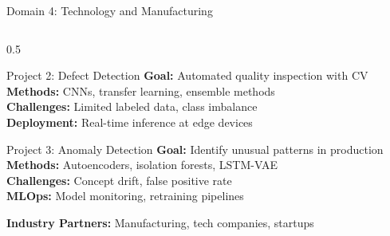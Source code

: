 \begin{frame}{Domain 4: Technology and Manufacturing}
\begin{columns}
\begin{column}{0.5\textwidth}
\vspace{0.2cm}

\begin{block}{Project 2: Defect Detection}
\textbf{Goal:} Automated quality inspection with CV\\
\textbf{Methods:} CNNs, transfer learning, ensemble methods\\
\textbf{Challenges:} Limited labeled data, class imbalance\\
\textbf{Deployment:} Real-time inference at edge devices
\end{block}

\vspace{0.2cm}

\begin{block}{Project 3: Anomaly Detection}
\textbf{Goal:} Identify unusual patterns in production\\
\textbf{Methods:} Autoencoders, isolation forests, LSTM-VAE\\
\textbf{Challenges:} Concept drift, false positive rate\\
\textbf{MLOps:} Model monitoring, retraining pipelines
\end{block}

\vspace{0.2cm}

\textbf{Industry Partners:} Manufacturing, tech companies, startups
\end{column}
\end{columns}
\end{frame}


